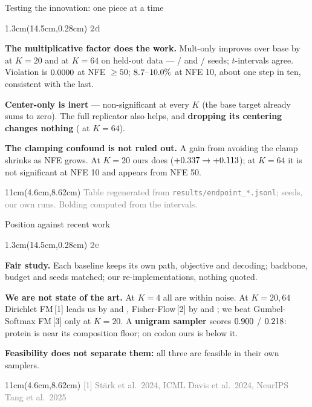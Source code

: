 \documentclass[aspectratio=169,10pt]{beamer}
\newcommand{\lab}[1]{%
  \begin{textblock*}{1.3cm}(14.5cm,0.28cm)
    \raggedleft\bfseries\small\textcolor{gray}{#1}
  \end{textblock*}}
\newcommand{\srcs}[1]{%
  \begin{textblock*}{11cm}(4.6cm,8.62cm)
    \raggedleft\fontsize{4.8}{5.6}\selectfont\textcolor{gray}{#1}
  \end{textblock*}}
\begin{document}
\begin{frame}{Testing the innovation: one piece at a time}
\lab{2d}
\begin{center}\tiny\end{center}
\textbf{The multiplicative factor does the work.} Mult-only improves over base by
\MultCIProt{} at $K{=}20$ and \MultCICodon{} at $K{=}64$ on held-out data --- \MultProtPos/\MultProtN{}
and \MultCodonPos/\MultCodonN{} seeds; $t$-intervals agree. Violation is $0.0000$ at
NFE $\ge 50$; $8.7$--$10.0\%$ at NFE 10, about one step in ten, consistent with the last.

\medskip
\textbf{Center-only is inert} --- non-significant at every $K$ (the base target already sums to
zero). The full replicator also helps, and \textbf{dropping its centering changes nothing}
(\DropCenterCICodon{} at $K{=}64$).

\medskip
\textbf{The clamping confound is not ruled out.} A gain from avoiding the clamp shrinks as NFE grows.
At $K{=}20$ ours does ($+0.337\rightarrow+0.113$); at $K{=}64$ it is not
significant at NFE 10 and appears from NFE 50.
\srcs{Table regenerated from \texttt{results/endpoint\_*.jsonl}; \MOneSeeds{} seeds, our own runs. Bolding computed from the intervals.}
\end{frame}

\begin{frame}{Position against recent work}
\lab{2e}
\begin{center}\tiny\resizebox{0.92\linewidth}{!}{}\end{center}
\textbf{Fair study.} Each baseline keeps its own path, objective and decoding; backbone, budget and
seeds matched; our re-implementations, nothing quoted.

\medskip
\textbf{We are not state of the art.} At $K{=}4$ all are within noise. At $K{=}20,64$ Dirichlet
FM\,[1] leads us by \DirichletVsOursProt{} and \DirichletVsOursCodon, Fisher-Flow\,[2] by
\FisherVsOursProt{} and \FisherVsOursCodon; we beat Gumbel-Softmax FM\,[3] only at $K{=}20$. A \textbf{unigram sampler} scores
$0.900$ / $0.218$: protein is near its composition floor; on codon ours is below it.

\medskip
\textbf{Feasibility does not separate them:} all three are feasible in their own samplers.
\srcs{[1] St\"ark et al.\ 2024, ICML \quad [2] Davis et al.\ 2024, NeurIPS \quad [3] Tang et al.\ 2025}
\end{frame}
\end{document}
